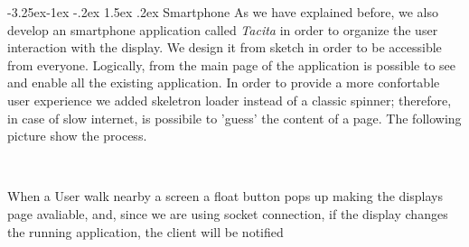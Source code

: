 \documentclass[]{usiinfbachelorproject}
\makeatletter
\newcommand\subsubsection{\@startsection{subsubsection}{3}{\z@}%
                {-3.25ex\@plus -1ex \@minus -.2ex}%
                {1.5ex \@plus .2ex}%
                {\normalfont\normalsize\bfseries}}
\makeatother
\begin{document}
\subsubsection{Smartphone}
As we have explained before, we also develop an smartphone application called \emph{Tacita} in order to organize the user interaction with the display. We design it from sketch in order to be accessible from everyone. Logically, from the main page of the application is possible to see and enable all the existing application. In order to provide a more confortable user experience we added skeletron loader instead of a classic spinner; therefore, in case of slow internet, is possibile to 'guess' the content of a page. The following picture show the process.
\begin{figure}[H]
  \centering
  \
  \
  \
\end{figure}
When a User walk nearby a screen a float button pops up making the displays page avaliable, and, since we are using socket connection, if the display changes the running application, the client will be notified
\end{document}
